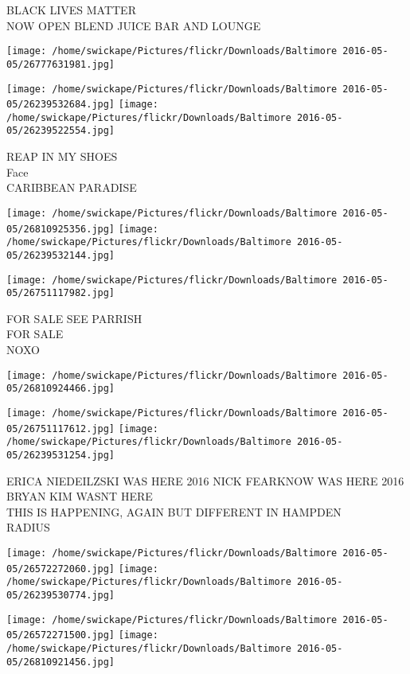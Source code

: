 \documentclass[10pt,letterpaper]{article}
\begin{document}
BLACK LIVES MATTER\\
NOW OPEN BLEND JUICE BAR AND LOUNGE\\
\pagebreak

\texttt{[image: /home/swickape/Pictures/flickr/Downloads/Baltimore 2016-05-05/26777631981.jpg]}

\vspace{0.25in}
\texttt{[image: /home/swickape/Pictures/flickr/Downloads/Baltimore 2016-05-05/26239532684.jpg]}
\texttt{[image: /home/swickape/Pictures/flickr/Downloads/Baltimore 2016-05-05/26239522554.jpg]}

REAP IN MY SHOES\\
Face\\
CARIBBEAN PARADISE\\
\pagebreak

\texttt{[image: /home/swickape/Pictures/flickr/Downloads/Baltimore 2016-05-05/26810925356.jpg]}
\texttt{[image: /home/swickape/Pictures/flickr/Downloads/Baltimore 2016-05-05/26239532144.jpg]}

\texttt{[image: /home/swickape/Pictures/flickr/Downloads/Baltimore 2016-05-05/26751117982.jpg]}

FOR SALE SEE PARRISH\\
FOR SALE\\
NOXO\\
\pagebreak

\texttt{[image: /home/swickape/Pictures/flickr/Downloads/Baltimore 2016-05-05/26810924466.jpg]}

\vspace{0.25in}
\texttt{[image: /home/swickape/Pictures/flickr/Downloads/Baltimore 2016-05-05/26751117612.jpg]}
\texttt{[image: /home/swickape/Pictures/flickr/Downloads/Baltimore 2016-05-05/26239531254.jpg]}

ERICA NIEDEILZSKI WAS HERE 2016 NICK FEARKNOW WAS HERE 2016 BRYAN KIM WASNT HERE\\
THIS IS HAPPENING, AGAIN BUT DIFFERENT IN HAMPDEN\\
RADIUS\\
\pagebreak

\texttt{[image: /home/swickape/Pictures/flickr/Downloads/Baltimore 2016-05-05/26572272060.jpg]}
\texttt{[image: /home/swickape/Pictures/flickr/Downloads/Baltimore 2016-05-05/26239530774.jpg]}

\texttt{[image: /home/swickape/Pictures/flickr/Downloads/Baltimore 2016-05-05/26572271500.jpg]}
\texttt{[image: /home/swickape/Pictures/flickr/Downloads/Baltimore 2016-05-05/26810921456.jpg]}
\end{document}
